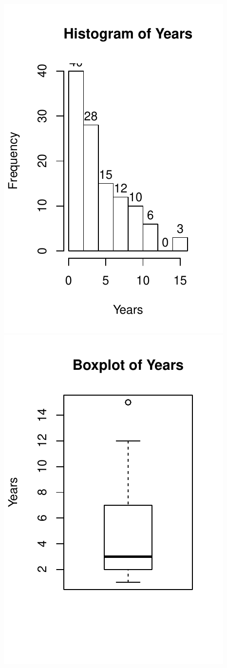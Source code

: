 \documentclass[]{book}
\begin{document}
\includegraphics{GreenwoodBanner_files/figure-latex/Figure2-1-1.pdf}
\includegraphics{GreenwoodBanner_files/figure-latex/Figure2-1-2.pdf}
\end{document}

